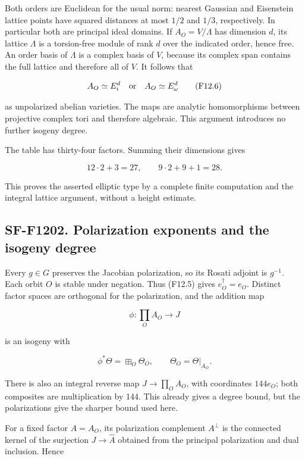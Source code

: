 Both orders are Euclidean for the usual norm: nearest Gaussian and
Eisenstein lattice points have squared distances at most \(1/2\) and
\(1/3\), respectively. In particular both are principal ideal domains.
If \(A_O=V/\Lambda\) has dimension \(d\), its lattice \(\Lambda\) is a
torsion-free module of rank \(d\) over the indicated order, hence free.
An order basis of \(\Lambda\) is a complex basis of \(V\), because its
complex span contains the full lattice and therefore all of \(V\). It
follows that

\[
 A_O\simeq E_i^d\quad\hbox{or}\quad A_O\simeq E_\omega^d
 \tag{F12.6}
\]

as unpolarized abelian varieties. The maps are analytic homomorphisms
between projective complex tori and therefore algebraic. This argument
introduces no further isogeny degree.

The table has thirty-four factors. Summing their dimensions gives

\[
 12\cdot2+3=27,\qquad
 9\cdot2+9+1=28.
\]

This proves the asserted elliptic type by a complete finite computation
and the integral lattice argument, without a height estimate.

\subsection{SF-F1202. Polarization exponents and the isogeny
degree}\label{SF-F1202}

Every \(g\in G\) preserves the Jacobian polarization, so its Rosati
adjoint is \(g^{-1}\). Each orbit \(O\) is stable under negation. Thus
(F12.5) gives \(e_O^\dagger=e_O\). Distinct factor spaces are orthogonal
for the polarization, and the addition map

\[
 \phi:\prod_O A_O\longrightarrow J
 \tag{F12.7}
\]

is an isogeny with

\[
 \phi^*\Theta=\boxplus_O\Theta_O,\qquad
 \Theta_O=\Theta|_{A_O}.
 \tag{F12.8}
\]

There is also an integral reverse map \(J\to\prod_O A_O\), with
coordinates \(144e_O\); both composites are multiplication by 144. This
already gives a degree bound, but the polarizations give the sharper
bound used here.

For a fixed factor \(A=A_O\), its polarization complement \(A^\perp\) is
the connected kernel of the surjection \(J\to\widehat A\) obtained from
the principal polarization and dual inclusion. Hence

